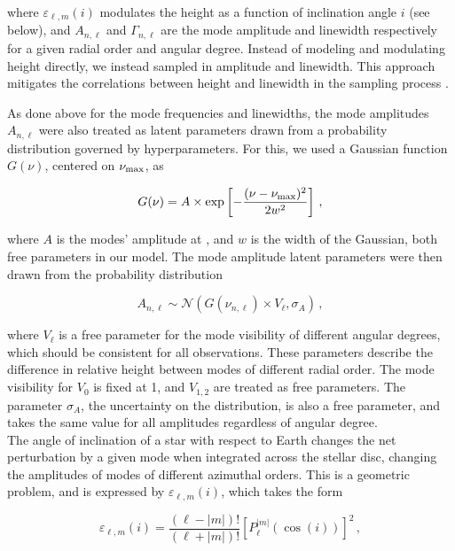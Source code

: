 \noindent where $\varepsilon_{\ell, m}(i)$ modulates the height as a function of inclination angle $i$ (see below), and $A_{n, \ell}$ and $\Gamma_{n, \ell}$ are the mode amplitude and linewidth respectively for a given radial order and angular degree. Instead of modeling and modulating height directly, we instead sampled in amplitude and linewidth. This approach mitigates the correlations between height and linewidth in the sampling process \cite{toutain+appourchaux1994}.

As done above for the mode frequencies and linewidths, the mode amplitudes $A_{n,\ell}$ were also treated as latent parameters drawn from a probability distribution governed by hyperparameters. For this, we used a Gaussian function $G(\nu)$, centered on $\mbox{$\nu_{\rm max}$}$, as

\begin{equation}\label{eq:amplitude}
	G(\nu) = A \times \exp\left[-\frac{(\nu - \mbox{$\nu_{\rm max}$})^2}{2w^2}\right]\, ,
\end{equation}

\noindent where $A$ is the modes' amplitude at \numax, and $w$ is the width of the Gaussian, both free parameters in our model. 
The mode amplitude latent parameters were then drawn from the probability distribution

\begin{equation}\label{eq:amplitwod}
	A_{n, \ell} \sim \mathcal{N}(G(\nu_{n,\ell}) \times V_\ell, \sigma_{A})\, ,
\end{equation}

\noindent where $V_\ell$ is a free parameter for the mode visibility of different angular degrees, which should be consistent for all \kepler observations. These parameters describe the difference in relative height between modes of different radial order. The mode visibility for $V_0$ is fixed at 1, and $V_{1,2}$ are treated as free parameters. The parameter $\sigma_{A}$, the uncertainty on the distribution, is also a free parameter, and takes the same value for all amplitudes regardless of angular degree.\\

The angle of inclination of a star with respect to Earth changes the net perturbation by a given mode when integrated across the stellar disc, changing the amplitudes of modes of different azimuthal orders. This is a geometric problem, and is expressed by $\varepsilon_{\ell, m}(i)$, which takes the form \cite{gizon+solanki2003}

\begin{equation}\label{eq:legendre}
	\varepsilon_{\ell, m}(i) = \frac{(\ell - |m|)!}{(\ell + |m|)!}\left[P_\ell^{|m|}(\cos(i))\right]^2\, ,
\end{equation}

